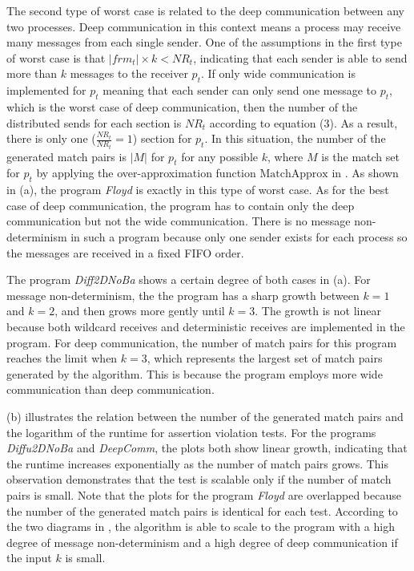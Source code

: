 The second type of worst case is related to the deep communication between any two processes. Deep communication in this context means a process may receive many messages from each single sender.
One of the assumptions in the first type of worst case is that $|frm_t|\times k < \mathit{NR}_t$, indicating that each sender is able to send more than $k$ messages to the receiver $p_t$. 
If only wide communication is implemented for $p_t$ meaning that each sender can only send one message to $p_t$, which is the worst case of deep communication, then the number of the distributed sends for each section is $\mathit{NR}_t$ according to equation (3). 
As a result, there is only one ($\frac{\mathit{NR}_t}{\mathit{NR}_t} = 1$) section for $p_t$. 
In this situation, the number of the generated match pairs is $|M|$ for $p_t$ for any possible $k$, where $M$ is the match set for $p_t$ by applying the over-approximation function $\mathrm{MatchApprox}$ in . 
As shown in  (a), the program \textit{Floyd} is exactly in this type of worst case. 
As for the best case of deep communication, the program has to contain only the deep communication but not the wide communication. There is no message non-determinism in such a program because only one sender exists for each process so the messages are received in a fixed FIFO order.

The program \textit{Diff2DNoBa} shows a certain degree of both cases in  (a). For message non-determinism, the the program has a sharp growth between $k=1$ and $k=2$, and then grows more gently until $k=3$. The growth is not linear because both wildcard receives and deterministic receives are implemented in the program. For deep communication, the number of match pairs for this program reaches the limit when $k=3$, which represents the largest set of match pairs generated by the algorithm. This is because the program employs more wide communication than deep communication.  

 (b) illustrates the relation between the number of the generated match pairs and the logarithm of the runtime for assertion violation tests. 
For the programs \textit{Diffu2DNoBa} and \textit{DeepComm}, the plots both show linear growth, indicating that the runtime increases exponentially as the number of match pairs grows. 
This observation demonstrates that the test is scalable only if the number of match pairs is small. 
Note that the plots for the program \textit{Floyd} are overlapped because the number of the generated match pairs is identical for each test.
According to the two diagrams in , the algorithm is able to scale to the program with a high degree of message non-determinism and a high degree of deep communication if the input $k$ is small.





